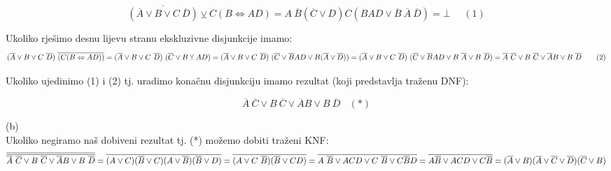 \documentclass[12pt]{article}
\begin{document}
\begin{enumerate}
\begin{equation*}
		    \overline{(\overline{A} \vee B \vee C~\overline{D})} \veebar{} C(B \Leftrightarrow AD)  =
		    A~\overline{B}(\overline{C} \vee D)C(BAD \vee \overline{B}~\overline{A}~\overline{D}) = \bot ~~~~~~ (1) 
		    
		\end{equation*}
		
		Ukoliko rješimo desnu lijevu stranu ekskluzivne disjunkcije imamo: 		
		\begin{equation*}
		
		    (\overline{A} \vee B \vee C~\overline{D})~\overline{(C(B \Leftrightarrow AD))} =
		    (\overline{A} \vee B \vee C~\overline{D})~(\overline{C} \vee B \veebar{} AD) =
		    (\overline{A} \vee B \vee C~\overline{D})~(\overline{C} \vee \overline{B}AD \vee B(\overline{A} \vee \overline{D})) = \\
		    
		    (\overline{A} \vee B \vee C~\overline{D})~(\overline{C} \vee \overline{B}AD \vee B~\overline{A} \vee B~\overline{D}) = \overline{A}~\overline{C} \vee B~\overline{C} \vee \overline{A}B \vee B~\overline{D} ~~~~~~ (2)
		    
		\end{equation*}
		
		Ukoliko ujedinimo (1) i (2) tj. uradimo konačnu disjunkciju imamo rezultat
		(koji predstavlja traženu DNF):
		
		\begin{equation*}
		    \overline{A}~\overline{C} \vee B~\overline{C} \vee \overline{A}B \vee B~\overline{D} ~~~~ (*)
		\end{equation*}

	    (b) \\
	    
	    Ukoliko negiramo naš dobiveni rezultat tj. (*) možemo dobiti traženi KNF: \\	    
	    \begin{equation*}
	    
	        \overline{\overline{\overline{A}~\overline{C} \vee B~\overline{C} \vee \overline{A}B \vee B~\overline{D}}} = \overline{(A \vee C)(\overline{B} \vee C)(A \vee \overline{B})(\overline{B} \vee D)} = \overline{(A \vee C~\overline{B})(\overline{B} \vee CD)} = \\
	        
	        \overline{A~\overline{B} \vee ACD \vee C~\overline{B} \vee C\overline{B}D} = \overline{A\overline{B} \vee ACD \vee C\overline{B}} = (\overline{A} \vee B)(\overline{A} \vee \overline{C} \vee \overline{D})(\overline{C} \vee B) 
	        

\end{equation*}
\end{enumerate}
\end{document}
